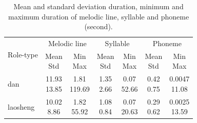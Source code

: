 \begin{table}[ht]
    \centering
    \begin{tabular}{l|cc|cc|cc}
        \toprule
        \multirow{2}{*}{Role-type} & \multicolumn{2}{c|}{Melodic line} & \multicolumn{2}{c|}{Syllable} & \multicolumn{2}{c}{Phoneme} \\
        & \makecell{Mean\\Std} & \makecell{Min\\Max} & \makecell{Mean\\Std} & \makecell{Min\\Max} & \makecell{Mean\\Std} & \makecell{Min\\Max} \\
        \midrule
        dan           & \makecell{11.93\\13.85} & \makecell{1.81\\119.69} & \makecell{1.35\\2.66} & \makecell{0.07\\52.66} & \makecell{0.42\\0.75} & \makecell{0.0047\\11.08} \\
        \hline
        laosheng      & \makecell{10.02\\8.86} & \makecell{1.82\\55.92} & \makecell{1.08\\0.84} & \makecell{0.07\\20.63} & \makecell{0.29\\0.62} & \makecell{0.0025\\13.59} \\
        \bottomrule
    \end{tabular}
    \caption{Mean and standard deviation duration, minimum and maximum duration of melodic line, syllable and phoneme (second).}
    \label{table:ch4:mean_std_min_max}
\end{table}

